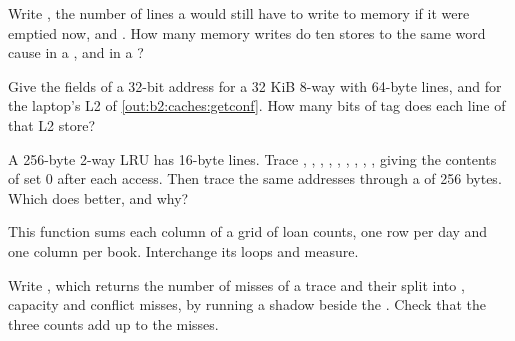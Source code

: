 \begin{exercise}[$\star$]\label{exo:b2:caches:3}
Write , the number of lines a   would still have to write to memory if
it were emptied now, and . How many memory writes do ten stores to the same word cause in a
 , and in a  ?
\end{exercise}

\begin{exercise}[$\star$]\label{exo:b2:caches:4}
Give the fields of a 32-bit address for a 32 KiB 8-way  with 64-byte lines, and for the laptop's L2 of
\cref{out:b2:caches:getconf}. How many bits of tag does each line of that L2 store?
\end{exercise}

\begin{exercise}[$\star\star$]\label{exo:b2:caches:5}
A 256-byte 2-way LRU  has 16-byte lines. Trace , , , ,
, , , , , giving the contents of set 0 after each
access. Then trace the same addresses through a  of 256 bytes. Which does better, and why?
\end{exercise}

\begin{exercise}[$\star\star$]\label{exo:b2:caches:6}
This function sums each column of a grid of loan counts, one row per day and one column per book. Interchange its
loops and measure.
\end{exercise}

\begin{exercise}[$\star\star$]\label{exo:b2:caches:7}
Write , which returns the number of misses of a trace and their split into
, capacity and conflict misses, by running a  shadow  beside the . Check that
the three counts add up to the misses.
\end{exercise}

